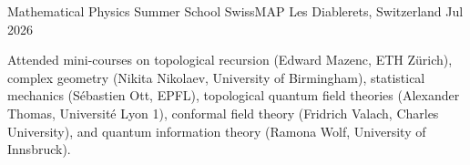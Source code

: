 
\begin{cventries}
    \cventry
    {Mathematical Physics Summer School}
    {SwissMAP}
    {Les Diablerets, Switzerland}
    {Jul 2026}
    {
        \begin{cvitems}
            \item {Attended mini-courses on topological recursion (Edward Mazenc, ETH Zürich), complex geometry (Nikita Nikolaev, University of Birmingham), statistical mechanics (Sébastien Ott, EPFL), topological quantum field theories (Alexander Thomas, Université Lyon 1), conformal field theory (Fridrich Valach, Charles University), and quantum information theory (Ramona Wolf, University of Innsbruck).}
        \end{cvitems}
    }
\end{cventries}
